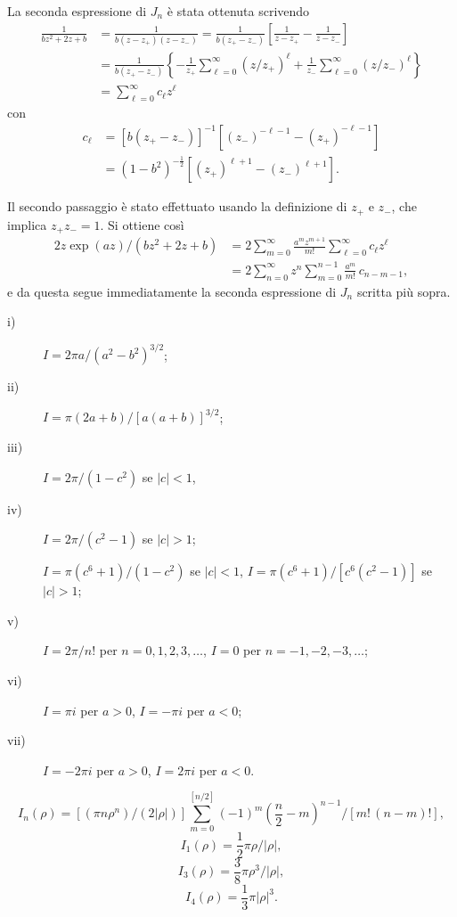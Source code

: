 \documentclass[11pt, a4paper]{book}
\numberwithin{equation}{section}
\begin{document}
\begin{description}
La seconda espressione di $J_n$ è stata ottenuta scrivendo
\begin{align*}
\frac{1}{bz^2+2z+b} &= \frac{1}{b(z-z_+)(z-z_-)} = \frac{1}{b(z_+-z_-)}\left[\frac{1}{z-z_+} - \frac{1}{z-z_-}\right] \\
&= \frac{1}{b(z_+-z_-)}\left\{-\frac{1}{z_+}\sum_{\ell=0}^{\infty}(z/z_+)^\ell + \frac{1}{z_-}\sum_{\ell=0}^{\infty}(z/z_-)^\ell\right\} \\
&= \sum_{\ell=0}^{\infty} c_\ell z^\ell
\end{align*}
con
\begin{align*}
c_\ell &= \left[b(z_+-z_-)\right]^{-1}\left[(z_-)^{-\ell-1} - (z_+)^{-\ell-1}\right] \\
&= (1-b^2)^{-\frac{1}{2}}\left[(z_+)^{\ell+1} - (z_-)^{\ell+1}\right].
\end{align*}

Il secondo passaggio è stato effettuato usando la definizione di $z_+$ e $z_-$, che implica $z_+ z_- = 1$. Si ottiene così
\begin{align*}
2z\exp(az)/(bz^2+2z+b) &= 2\sum_{m=0}^{\infty}\frac{a^m z^{m+1}}{m!}\sum_{\ell=0}^{\infty} c_\ell z^\ell \\
&= 2\sum_{n=0}^{\infty} z^n \sum_{m=0}^{n-1} \frac{a^m}{m!}\,c_{n-m-1},
\end{align*}
e da questa segue immediatamente la seconda espressione di $J_n$ scritta più sopra.

\item[7-2] 
\begin{description}
\item[i)] $I = 2\pi a / (a^2-b^2)^{3/2}$;
\item[ii)] $I = \pi(2a+b)/\left[a(a+b)\right]^{3/2}$;
\item[iii)] $I = 2\pi/(1-c^2)$ \quad se $|c| < 1$,
\item[iv)] $I = 2\pi/(c^2-1)$ \quad se $|c| > 1$;
\item[] $I = \pi(c^6+1)/(1-c^2)$ \quad se $|c| < 1$, \quad $I = \pi(c^6+1)/\left[c^6(c^2-1)\right]$ \quad se $|c| > 1$;
\item[v)] $I = 2\pi/n!$ \quad per $n = 0, 1, 2, 3, \ldots$, \quad $I = 0$ \quad per $n = -1, -2, -3, \ldots$;
\item[vi)] $I = \pi i$ \quad per $a > 0$, \quad $I = -\pi i$ \quad per $a < 0$;
\item[vii)] $I = -2\pi i$ \quad per $a > 0$, \quad $I = 2\pi i$ \quad per $a < 0$.
\end{description}

\item[7-3] 
$$I_n(\rho) = \left[(\pi n\rho^n)/(2|\rho|)\right]\sum_{m=0}^{[n/2]} (-1)^m \left(\frac{n}{2}-m\right)^{n-1}/\left[m!\,(n-m)!\right],$$
$$I_1(\rho) = \frac{1}{2}\pi\rho/|\rho|,$$
$$I_3(\rho) = \frac{3}{8}\pi\rho^3/|\rho|,$$
$$I_4(\rho) = \frac{1}{3}\pi|\rho|^3.$$


\end{description}
\end{document}
